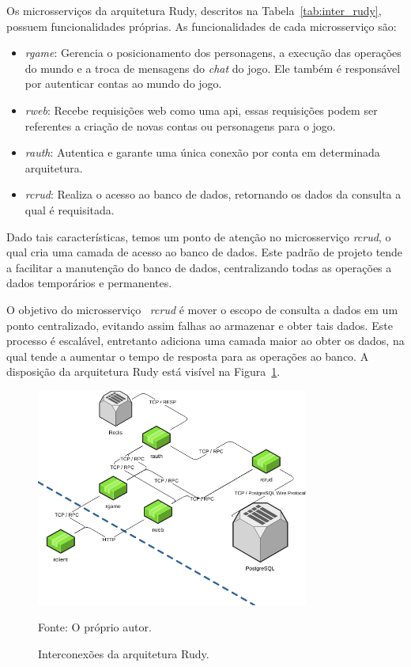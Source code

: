Os microsserviços da arquitetura Rudy, descritos na Tabela~\ref{tab:inter_rudy}, possuem funcionalidades próprias.
%
As funcionalidades de cada microsserviço são:



\begin{itemize}
  \item \textit{rgame}: Gerencia o posicionamento dos personagens, a execução das operações do mundo e a troca de mensagens do \textit{chat} do jogo. Ele também é responsável por autenticar contas ao mundo do jogo.
  \item \textit{rweb}: Recebe requisições web como uma \ac{api}, essas requisições podem ser referentes a criação de novas contas ou personagens para o jogo.
  \item \textit{rauth}: Autentica e garante uma única conexão por conta em determinada arquitetura.
  \item \textit{rcrud}: Realiza o acesso ao banco de dados, retornando os dados da consulta a qual é requisitada.
\end{itemize}



Dado tais características, temos um ponto de atenção no microsserviço \textit{rcrud}, o qual cria uma camada de acesso ao banco de dados.
%
Este padrão de projeto tende a facilitar a manutenção do banco de dados, centralizando todas as operações a dados temporários e permanentes.

O objetivo do microsserviço ~\textit{rcrud} é mover o escopo de consulta a dados em um ponto centralizado, evitando assim falhas ao armazenar e obter tais dados.
%
Este processo é escalável, entretanto adiciona uma camada maior ao obter os dados, na qual tende a aumentar o tempo de resposta para as operações ao banco.
%
A disposição da arquitetura Rudy está visível na Figura~\ref{fig:interconexao_rudy}.



\begin{figure}[htb!]
  \caption{Interconexões da arquitetura Rudy.}
  \label{fig:interconexao_rudy}
  \includegraphics[width=0.8\textwidth]{figuras/interconexoes/rudy.png}
  \centering

  Fonte: O próprio autor.
\end{figure}


